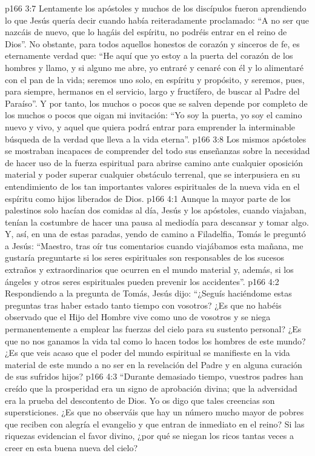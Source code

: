 \vs p166 3:7 Lentamente los apóstoles y muchos de los discípulos fueron aprendiendo lo que Jesús quería decir cuando había reiteradamente proclamado: “A no ser que nazcáis de nuevo, que lo hagáis del espíritu, no podréis entrar en el reino de Dios”. No obstante, para todos aquellos honestos de corazón y sinceros de fe, es eternamente verdad que: “He aquí que yo estoy a la puerta del corazón de los hombres y llamo, y si alguno me abre, yo entraré y cenaré con él y lo alimentaré con el pan de la vida; seremos uno solo, en espíritu y propósito, y seremos, pues, para siempre, hermanos en el servicio, largo y fructífero, de buscar al Padre del Paraíso”. Y por tanto, los muchos o pocos que se salven depende por completo de los muchos o pocos que oigan mi invitación: “Yo soy la puerta, yo soy el camino nuevo y vivo, y aquel que quiera podrá entrar para emprender la interminable búsqueda de la verdad que lleva a la vida eterna”.
\vs p166 3:8 Los mismos apóstoles se mostraban incapaces de comprender del todo sus enseñanzas sobre la necesidad de hacer uso de la fuerza espiritual para abrirse camino ante cualquier oposición material y poder superar cualquier obstáculo terrenal, que se interpusiera en su entendimiento de los tan importantes valores espirituales de la nueva vida en el espíritu como hijos liberados de Dios.
\vs p166 4:1 Aunque la mayor parte de los palestinos solo hacían dos comidas al día, Jesús y los apóstoles, cuando viajaban, tenían la costumbre de hacer una pausa al mediodía para descansar y tomar algo. Y, así, en una de estas paradas, yendo de camino a Filadelfia, Tomás le preguntó a Jesús: “Maestro, tras oír tus comentarios cuando viajábamos esta mañana, me gustaría preguntarte si los seres espirituales son responsables de los sucesos extraños y extraordinarios que ocurren en el mundo material y, además, si los ángeles y otros seres espirituales pueden prevenir los accidentes”.
\vs p166 4:2 \pc Respondiendo a la pregunta de Tomás, Jesús dijo: “¿Seguís haciéndome estas preguntas tras haber estado tanto tiempo con vosotros? ¿Es que no habéis observado que el Hijo del Hombre vive como uno de vosotros y se niega permanentemente a emplear las fuerzas del cielo para su sustento personal? ¿Es que no nos ganamos la vida tal como lo hacen todos los hombres de este mundo? ¿Es que veis acaso que el poder del mundo espiritual se manifieste en la vida material de este mundo a no ser en la revelación del Padre y en alguna curación de sus sufridos hijos?
\vs p166 4:3 “Durante demasiado tiempo, vuestros padres han creído que la prosperidad era un signo de aprobación divina; que la adversidad era la prueba del descontento de Dios. Yo os digo que tales creencias son supersticiones. ¿Es que no observáis que hay un número mucho mayor de pobres que reciben con alegría el evangelio y que entran de inmediato en el reino? Si las riquezas evidencian el favor divino, ¿por qué se niegan los ricos tantas veces a creer en esta buena nueva del cielo?
